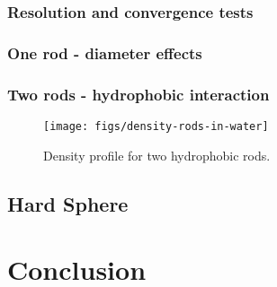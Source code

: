 \documentclass[letterpaper,twocolumn,amsmath,amssymb,prb]{revtex4-1}
\begin{document}
\subsubsection{Resolution and convergence tests}

\subsubsection{One rod - diameter effects}

\subsubsection{Two rods - hydrophobic interaction}

\begin{figure}
\begin{center}
\texttt{[image: figs/density-rods-in-water]}
\end{center}
\caption{ Density profile for two hydrophobic rods.}
\label{fig:density-rods}
\end{figure}

\subsection{Hard Sphere}

\section{Conclusion}

\end{document}
